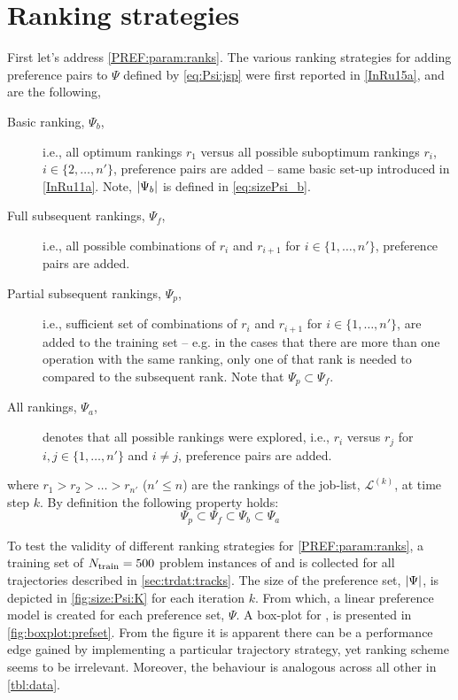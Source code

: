 \section{Ranking strategies}\label{sec:trdat:param:ranks}
First let's address \ref{PREF:param:ranks}. 
The various ranking strategies for adding preference pairs to $\Psi$ defined by 
\cref{eq:Psi:jsp} were first reported in \cref{InRu15a}, and are the following,
\begin{description}
    \item[Basic ranking, $\Psi_b$,] i.e., all optimum rankings $r_1$ versus all 
    possible suboptimum rankings $r_i$, $i\in\{2,\ldots,n'\}$, preference pairs 
    are added -- same basic set-up introduced in \cref{InRu11a}. Note, 
    $\lvert\Psi_b\rvert$ is defined in \cref{eq:sizePsi_b}.
    \item[Full subsequent rankings, $\Psi_f$,] i.e., all possible combinations 
    of $r_i$ and $r_{i+1}$ for $i\in\{1,\ldots,n'\}$, preference pairs are 
    added.
    \item[Partial subsequent rankings, $\Psi_p$,] i.e., sufficient set of 
    combinations of $r_i$ and $r_{i+1}$ for $i\in\{1,\ldots,n'\}$, are added to 
    the training set -- e.g. in the cases that there are more than one 
    operation with the same ranking, only one of that rank is needed to 
    compared to the subsequent rank. Note that $\Psi_p\subset \Psi_f$.
    \item[All rankings, $\Psi_a$,] denotes that all possible rankings were 
    explored, i.e.,
    $r_i$ versus $r_j$ for $i,j\in\{1,\ldots,n'\}$ and $i\neq j$, preference 
    pairs are added.
\end{description}
where $r_1>r_2>\ldots>r_{n'}$ ($n'\leq n$) are the rankings of the job-list, 
$\mathcal{L}^{(k)}$, at time step $k$.
By definition the following property holds:
\begin{equation}\label{eq:Psi:size}
    \Psi_p \subset \Psi_f \subset \Psi_b \subset \Psi_a
\end{equation}

To test the validity of different ranking strategies for 
\ref{PREF:param:ranks}, 
a training set of $N_{\text{train}}=500$ problem instances of  and 
is collected for all trajectories described in 
\cref{sec:trdat:tracks}. 
The size of the preference set, $\lvert\Psi\rvert$, is depicted in 
\cref{fig:size:Psi:K} for each iteration $k$. 
From which, a linear preference model is created for each preference 
set, $\Psi$. A box-plot for \fullnamerho, is presented in 
\cref{fig:boxplot:prefset}. 
From the figure it is apparent there can be a performance edge gained by 
implementing a particular trajectory strategy, yet ranking scheme seems to be 
irrelevant. Moreover, the behaviour is analogous across all other 
\Problem[6\times5]{\train} in \cref{tbl:data}.

